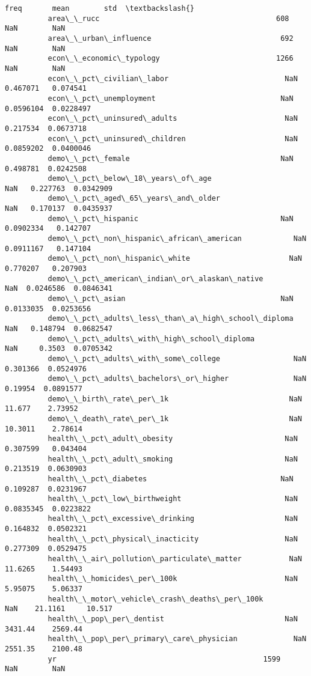 \documentclass[11pt]{article}
\begin{document}
\begin{Verbatim}[commandchars=\\\{\}]
                                                            freq       mean        std  \textbackslash{}
          area\_\_rucc                                         608        NaN        NaN   
          area\_\_urban\_influence                              692        NaN        NaN   
          econ\_\_economic\_typology                           1266        NaN        NaN   
          econ\_\_pct\_civilian\_labor                           NaN   0.467071   0.074541   
          econ\_\_pct\_unemployment                             NaN  0.0596104  0.0228497   
          econ\_\_pct\_uninsured\_adults                         NaN   0.217534  0.0673718   
          econ\_\_pct\_uninsured\_children                       NaN  0.0859202  0.0400046   
          demo\_\_pct\_female                                   NaN   0.498781  0.0242508   
          demo\_\_pct\_below\_18\_years\_of\_age                    NaN   0.227763  0.0342909   
          demo\_\_pct\_aged\_65\_years\_and\_older                  NaN   0.170137  0.0435937   
          demo\_\_pct\_hispanic                                 NaN  0.0902334   0.142707   
          demo\_\_pct\_non\_hispanic\_african\_american            NaN  0.0911167   0.147104   
          demo\_\_pct\_non\_hispanic\_white                       NaN   0.770207   0.207903   
          demo\_\_pct\_american\_indian\_or\_alaskan\_native        NaN  0.0246586  0.0846341   
          demo\_\_pct\_asian                                    NaN  0.0133035  0.0253656   
          demo\_\_pct\_adults\_less\_than\_a\_high\_school\_diploma   NaN   0.148794  0.0682547   
          demo\_\_pct\_adults\_with\_high\_school\_diploma          NaN     0.3503  0.0705342   
          demo\_\_pct\_adults\_with\_some\_college                 NaN   0.301366  0.0524976   
          demo\_\_pct\_adults\_bachelors\_or\_higher               NaN    0.19954  0.0891577   
          demo\_\_birth\_rate\_per\_1k                            NaN     11.677    2.73952   
          demo\_\_death\_rate\_per\_1k                            NaN    10.3011    2.78614   
          health\_\_pct\_adult\_obesity                          NaN   0.307599   0.043404   
          health\_\_pct\_adult\_smoking                          NaN   0.213519  0.0630903   
          health\_\_pct\_diabetes                               NaN   0.109287  0.0231967   
          health\_\_pct\_low\_birthweight                        NaN  0.0835345  0.0223822   
          health\_\_pct\_excessive\_drinking                     NaN   0.164832  0.0502321   
          health\_\_pct\_physical\_inacticity                    NaN   0.277309  0.0529475   
          health\_\_air\_pollution\_particulate\_matter           NaN    11.6265    1.54493   
          health\_\_homicides\_per\_100k                         NaN    5.95075    5.06337   
          health\_\_motor\_vehicle\_crash\_deaths\_per\_100k        NaN    21.1161     10.517   
          health\_\_pop\_per\_dentist                            NaN    3431.44    2569.44   
          health\_\_pop\_per\_primary\_care\_physician             NaN    2551.35    2100.48   
          yr                                                1599        NaN        NaN   
          

\end{Verbatim}
\end{document}
